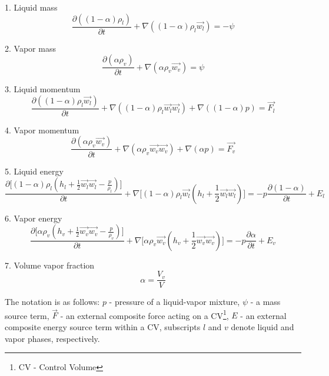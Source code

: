 1. Liquid mass
\begin{equation} \label{eq:athlet-1}
\frac{\partial ((1-\alpha)\rho_{l})}{\partial t} + \nabla ((1-\alpha) \rho_{l} \vec{w_{l}}) = - \psi
\end{equation}


2. Vapor mass
\begin{equation} \label{eq:athlet-2}
\frac{\partial (\alpha \rho_{v})}{\partial t} + \nabla (\alpha \rho_{v} \vec{w_{v}}) = \psi
\end{equation}


3. Liquid momentum
\begin{equation} \label{eq:athlet-3}
\frac{\partial ((1-\alpha) \rho_{l} \vec{w_{l}})}{\partial t} + \nabla ((1-\alpha) \rho_{l} \vec{w_{l}} \vec{w_{l}}) + \nabla ((1 - \alpha)p) = \vec{F_{l}}
\end{equation}


4. Vapor momentum
\begin{equation} \label{eq:athlet-4}
\frac{\partial (\alpha \rho_{v} \vec{w_{v}})}{\partial t} + \nabla (\alpha \rho_{v} \vec{w_{v}} \vec{w_{v}}) + \nabla (\alpha p) = \vec{F_{v}}
\end{equation}


5. Liquid energy
\begin{equation} \label{eq:athlet-5}
\frac{\partial \Big[ (1-\alpha)\rho_{l}(h_{l} + \frac{1}{2} \vec{w_{l}} \vec{w_{l}} - \frac{p}{\rho_{l}}) \Big]}{\partial t} + \nabla \Big[ (1-\alpha)\rho_{l}\vec{w_{l}}(h_{l} + \frac{1}{2} \vec{w_{l}} \vec{w_{l}}) \Big] = - p \frac{\partial (1 - \alpha)}{\partial t} + E_{l}
\end{equation}


6. Vapor energy
\begin{equation} \label{eq:athlet-6}
\frac{\partial \Big[ \alpha \rho_{v}(h_{v} + \frac{1}{2} \vec{w_{v}} \vec{w_{v}} - \frac{p}{\rho_{v}}) \Big]}{\partial t} + \nabla \Big[ \alpha\rho_{v}\vec{w_{v}}(h_{v} + \frac{1}{2} \vec{w_{v}} \vec{w_{v}}) \Big] = - p \frac{\partial \alpha}{\partial t} + E_{v}
\end{equation}

7. Volume vapor fraction
\begin{equation} \label{eq:athlet-7}
	\alpha = \frac{V_{v}}{V}
\end{equation}


The notation is as follows: $p$ - pressure of a liquid-vapor mixture, $\psi$ - a mass source term, $\vec{F}$ - an external composite force acting on a CV\footnote{CV - Control Volume}, $E$ - an external composite energy source term within a CV, subscripts $l$ and $v$ denote liquid and vapor phases, respectively. \\


